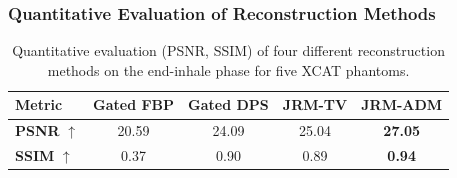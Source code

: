 \begin{frame}[fragile]
        \frametitle{Quantitative Evaluation of Reconstruction Methods}

        \begin{table}[ht]
                \centering
                \renewcommand{\arraystretch}{1.2} %
                \setlength{\tabcolsep}{6pt}       %
                \footnotesize                     %
                \begin{tabular}{lcccc}
                        \toprule
                        \textbf{Metric}          & \textbf{Gated FBP} & \textbf{Gated DPS} & \textbf{JRM-TV} & \textbf{JRM-ADM} \\
                        \midrule
                        \textbf{PSNR} $\uparrow$ & 20.59              & 24.09              & 25.04           & \textbf{27.05}   \\
                        \textbf{SSIM} $\uparrow$ & 0.37               & 0.90               & 0.89            & \textbf{0.94}    \\
                        \bottomrule
                \end{tabular}
                \caption{Quantitative evaluation (PSNR, SSIM) of four different reconstruction methods on the end-inhale phase for five XCAT phantoms.}
        \end{table}
\end{frame}



